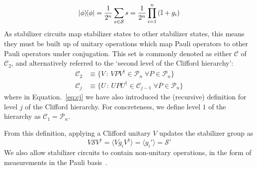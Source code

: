 \begin{equation}
    \ketbra{\phi} = \frac{1}{2^{n}}\sum_{s\in\mathcal{S}} s = \frac{1}{2^{n}}\prod_{i=1}^{n}\left(\mathbb{I}+g_{i}\right)
\end{equation}
As stabilizer circuits map stabilizer states to other stabilizer states, this means they must be built up of unitary operations which map Pauli operators to other Pauli operators under conjugation. This set is commonly denoted as either $\mathcal{C}$ of $\mathcal{C}_{2}$, and alternatively referred to the `second level of the Clifford hierarchy':
\begin{align}
    \mathcal{C}_{2} &\equiv \{V\,:\,VPV^{\dagger}\in\mathcal{P}_{n}\;\forall P\in\mathcal{P}_{n}\} \label{eq:c2}\\
    \mathcal{C}_{j} &\equiv \{U\,:\,UPU^{\dagger}\in\mathcal{C}_{j-1}\;\forall P\in\mathcal{P}_{n}\} \label{eq:cj}
\end{align}
where in Equation.~\ref{eq:cj} we have also introduced the (recursive) definition for level $j$ of the Clifford hierarchy. For concreteness, we define level $1$ of the hierarchy as $\mathcal{C}_{1}=\mathcal{P}_{n}$.\par
From this definition, applying a Clifford unitary $V$ updates the stabilizer group as
\begin{equation}
    V\mathcal{S}V^{\dagger}=\langle Vg_{i}V^{\dagger}\rangle = \langle g_{i}' \rangle = \mathcal{S}'
\end{equation}
We also allow stabilizer circuits to contain non-unitary operations, in the form of measurements in the Pauli basis~\cite{Gottesman1998b}.

